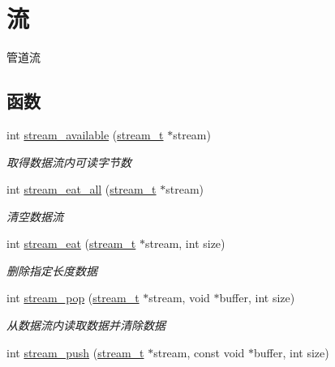 \hypertarget{a00107}{}\section{流}
\label{a00107}


管道流  


\subsection*{函数}
\begin{DoxyCompactItemize}
\item 
int \hyperlink{a00107_ga6e109b2dc520782567dc1891af3b945e_ga6e109b2dc520782567dc1891af3b945e}{stream\+\_\+available} (\hyperlink{a00050_a261dba04f46f5c59a68a05f69f5a65a8_a261dba04f46f5c59a68a05f69f5a65a8}{stream\+\_\+t} $\ast$stream)
\begin{DoxyCompactList}\small\item\em 取得数据流内可读字节数 \end{DoxyCompactList}\item 
int \hyperlink{a00107_gaef7f4ca2c201faf5d82a1dad4c8d7814_gaef7f4ca2c201faf5d82a1dad4c8d7814}{stream\+\_\+eat\+\_\+all} (\hyperlink{a00050_a261dba04f46f5c59a68a05f69f5a65a8_a261dba04f46f5c59a68a05f69f5a65a8}{stream\+\_\+t} $\ast$stream)
\begin{DoxyCompactList}\small\item\em 清空数据流 \end{DoxyCompactList}\item 
int \hyperlink{a00107_ga1ab922f8bab979099b3abc3ee54dc59d_ga1ab922f8bab979099b3abc3ee54dc59d}{stream\+\_\+eat} (\hyperlink{a00050_a261dba04f46f5c59a68a05f69f5a65a8_a261dba04f46f5c59a68a05f69f5a65a8}{stream\+\_\+t} $\ast$stream, int size)
\begin{DoxyCompactList}\small\item\em 删除指定长度数据 \end{DoxyCompactList}\item 
int \hyperlink{a00107_ga6e01758abf49f8b08cd457f1cb48a954_ga6e01758abf49f8b08cd457f1cb48a954}{stream\+\_\+pop} (\hyperlink{a00050_a261dba04f46f5c59a68a05f69f5a65a8_a261dba04f46f5c59a68a05f69f5a65a8}{stream\+\_\+t} $\ast$stream, void $\ast$buffer, int size)
\begin{DoxyCompactList}\small\item\em 从数据流内读取数据并清除数据 \end{DoxyCompactList}\item 
int \hyperlink{a00107_gae7e63ef142733eb3aea7401e28bc9a75_gae7e63ef142733eb3aea7401e28bc9a75}{stream\+\_\+push} (\hyperlink{a00050_a261dba04f46f5c59a68a05f69f5a65a8_a261dba04f46f5c59a68a05f69f5a65a8}{stream\+\_\+t} $\ast$stream, const void $\ast$buffer, int size)

\end{DoxyCompactItemize}
